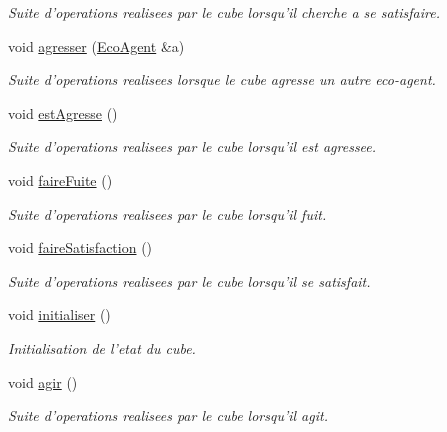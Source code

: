 \begin{CompactItemize}
\begin{CompactList}\small\item\em Suite d'operations realisees par le cube lorsqu'il cherche a se satisfaire. \item\end{CompactList}\item 
void \hyperlink{classCube_85556598281efcfa925dd4ef4c8acba5}{agresser} (\hyperlink{classEcoAgent}{EcoAgent} \&a)
\begin{CompactList}\small\item\em Suite d'operations realisees lorsque le cube agresse un autre eco-agent. \item\end{CompactList}\item 
\hypertarget{classCube_a9af44bff02fb06ac5be83f4c041fe57}{
void \hyperlink{classCube_a9af44bff02fb06ac5be83f4c041fe57}{estAgresse} ()}
\label{classCube_a9af44bff02fb06ac5be83f4c041fe57}

\begin{CompactList}\small\item\em Suite d'operations realisees par le cube lorsqu'il est agressee. \item\end{CompactList}\item 
\hypertarget{classCube_ce1011f5a33ce211d5ca44e029f59224}{
void \hyperlink{classCube_ce1011f5a33ce211d5ca44e029f59224}{faireFuite} ()}
\label{classCube_ce1011f5a33ce211d5ca44e029f59224}

\begin{CompactList}\small\item\em Suite d'operations realisees par le cube lorsqu'il fuit. \item\end{CompactList}\item 
\hypertarget{classCube_1fec2199edab8e6cfdb3685256d2cdec}{
void \hyperlink{classCube_1fec2199edab8e6cfdb3685256d2cdec}{faireSatisfaction} ()}
\label{classCube_1fec2199edab8e6cfdb3685256d2cdec}

\begin{CompactList}\small\item\em Suite d'operations realisees par le cube lorsqu'il se satisfait. \item\end{CompactList}\item 
void \hyperlink{classCube_6687c2575f4ce927f6b3032fb46040eb}{initialiser} ()
\begin{CompactList}\small\item\em Initialisation de l'etat du cube. \item\end{CompactList}\item 
\hypertarget{classCube_9289a4d72b849b7f868b189f531daa62}{
void \hyperlink{classCube_9289a4d72b849b7f868b189f531daa62}{agir} ()}
\label{classCube_9289a4d72b849b7f868b189f531daa62}

\begin{CompactList}\small\item\em Suite d'operations realisees par le cube lorsqu'il agit. \item\end{CompactList}\end{CompactItemize}
